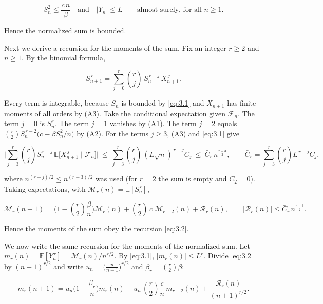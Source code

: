 \documentclass[aip,jmp,preprint,onecolumn,floatfix,superscriptaddress,nofootinbib,11pt]{revtex4-2}
\theoremstyle{plain}
\theoremstyle{remark}
\numberwithin{equation}{section}
\newcommand{\E}{\mathbb{E}}
\begin{document}
\begin{equation}
S_n^{2}\le \frac{c\,n}{\beta}\quad\text{and}\quad |Y_n|\le L\qquad\text{almost surely, for all }n\ge1.
\label{eq:3.1}
\end{equation}

Hence the normalized sum is bounded.

Next we derive a recursion for the moments of the sum. Fix an integer $r\ge2$ and $n\ge1$. By the binomial formula,

\begin{equation*}
S_{n+1}^{\,r}=\sum_{j=0}^{r}\binom rj\,S_n^{\,r-j}\,X_{n+1}^{\,j}.
\end{equation*}

Every term is integrable, because $S_n$ is bounded by \eqref{eq:3.1} and $X_{n+1}$ has finite moments of all orders by (A3). Take the conditional expectation given $\mathcal F_n$. The term $j=0$ is $S_n^{r}$. The term $j=1$ vanishes by (A1). The term $j=2$ equals $\binom r2 S_n^{\,r-2}\big(c-\beta S_n^{2}/n\big)$ by (A2). For the terms $j\ge3$, (A3) and \eqref{eq:3.1} give

\begin{equation*}
\Big|\sum_{j=3}^{r}\binom rj S_n^{\,r-j}\,\E\big[X_{n+1}^{\,j}\mid\mathcal F_n\big]\Big|\ \le\ \sum_{j=3}^{r}\binom rj\,(L\sqrt n)^{\,r-j}C_j\ \le\ \bar C_r\,n^{\frac{r-3}{2}},\qquad \bar C_r=\sum_{j=3}^{r}\binom rj L^{\,r-j}C_j ,
\end{equation*}

where $n^{(r-j)/2}\le n^{(r-3)/2}$ was used (for $r=2$ the sum is empty and $\bar C_2=0$). Taking expectations, with $\mathcal M_r(n)=\E[S_n^{\,r}]$,

\begin{equation}
\mathcal M_r(n+1)=\Big(1-\binom r2\frac{\beta}{n}\Big)\mathcal M_r(n)+\binom r2\,c\;\mathcal M_{r-2}(n)+\mathcal R_r(n),\qquad |\mathcal R_r(n)|\le \bar C_r\,n^{\frac{r-3}{2}} .
\label{eq:3.2}
\end{equation}

Hence the moments of the sum obey the recursion \eqref{eq:3.2}.

We now write the same recursion for the moments of the normalized sum. Let $m_r(n)=\E[Y_n^{\,r}]=\mathcal M_r(n)/n^{r/2}$. By \eqref{eq:3.1}, $|m_r(n)|\le L^{r}$. Divide \eqref{eq:3.2} by $(n+1)^{r/2}$ and write $u_n=\big(\tfrac{n}{n+1}\big)^{r/2}$ and $\beta_r=\binom r2\beta$:

\begin{equation*}
m_r(n+1)=u_n\Big(1-\frac{\beta_r}{n}\Big)m_r(n)+u_n\,\binom r2\frac{c}{n}\,m_{r-2}(n)+\frac{\mathcal R_r(n)}{(n+1)^{r/2}} .
\end{equation*}
\end{document}
